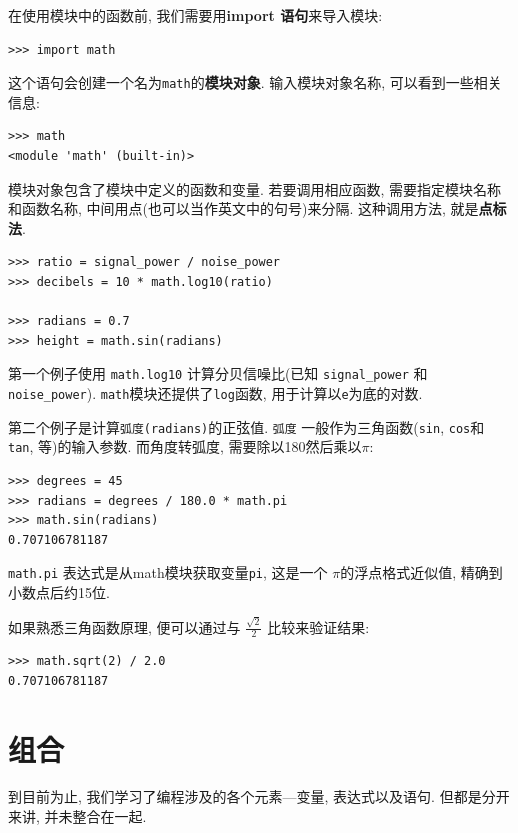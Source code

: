 \documentclass[10pt]{book}
\begin{document}
在使用模块中的函数前, 我们需要用{\bf import 语句}来导入模块:

\begin{verbatim}
>>> import math
\end{verbatim}
%
这个语句会创建一个名为{\tt math}的{\bf 模块对象}. 
输入模块对象名称, 可以看到一些相关信息:

\begin{verbatim}
>>> math
<module 'math' (built-in)>
\end{verbatim}
%
模块对象包含了模块中定义的函数和变量. 
若要调用相应函数, 需要指定模块名称和函数名称, 
中间用点(也可以当作英文中的句号)来分隔. 这种调用方法, 就是{\bf 点标法}. 

\begin{verbatim}
>>> ratio = signal_power / noise_power
>>> decibels = 10 * math.log10(ratio)

>>> radians = 0.7
>>> height = math.sin(radians)
\end{verbatim}
%
第一个例子使用 \verb"math.log10" 计算分贝信噪比(已知 \verb"signal_power" 和
\verb"noise_power"). 
{\tt math}模块还提供了{\tt log}函数, 用于计算以{\tt e}为底的对数. 

第二个例子是计算{\tt 弧度(radians)}的正弦值. 
{\tt 弧度} 一般作为三角函数({\tt sin}, {\tt cos}和 {\tt tan}, 等)的输入参数. 
而角度转弧度, 需要除以180然后乘以$\pi$:

\begin{verbatim}
>>> degrees = 45
>>> radians = degrees / 180.0 * math.pi
>>> math.sin(radians)
0.707106781187
\end{verbatim}
%
{\tt math.pi} 表达式是从math模块获取变量{\tt pi}, 
这是一个 $\pi$的浮点格式近似值, 
精确到小数点后约15位. 

如果熟悉三角函数原理, 
便可以通过与 $\frac{ \sqrt{2}} {2}$ 比较来验证结果:

\begin{verbatim}
>>> math.sqrt(2) / 2.0
0.707106781187
\end{verbatim}
%

\section{组合}

到目前为止, 我们学习了编程涉及的各个元素---变量, 表达式以及语句. 
但都是分开来讲, 并未整合在一起. 
\end{document}
